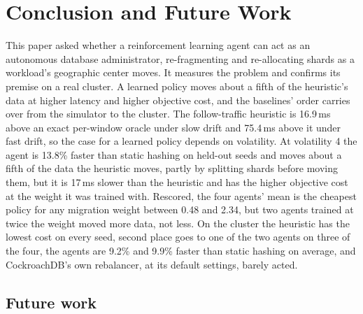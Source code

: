 
\section{Conclusion and Future Work}

This paper asked whether a reinforcement learning agent can act as an
autonomous database administrator, re-fragmenting and re-allocating shards
as a workload's geographic center moves. It measures the problem and confirms its premise on a real cluster. A learned policy moves about a fifth of the heuristic's data at higher latency and higher objective cost, and the baselines' order carries over from the simulator to the cluster.
The follow-traffic heuristic
is 16.9\,ms above an exact per-window oracle under slow drift and 75.4\,ms above
it under fast drift, so the case for a learned policy depends on volatility. At
volatility 4 the agent is 13.8\% faster than static hashing on held-out seeds
and moves about a fifth of the data the heuristic moves, partly by splitting
shards before moving them, but it is 17\,ms slower than the heuristic and has
the higher objective cost at the weight it was trained with. Rescored, the four
agents' mean is the cheapest policy for any migration weight between 0.48 and
2.34, but two agents trained at twice the weight moved more data, not less. On
the cluster the heuristic has the lowest cost on every seed, second place goes
to one of the two agents on three of the four, the agents are 9.2\% and 9.9\%
faster than static hashing on average, and CockroachDB's own rebalancer, at its default settings,
barely acted.

\subsection{Future work}

